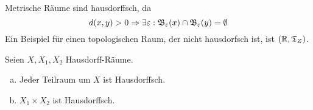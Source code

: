 \begin{bemerkung}
    Metrische Räume sind hausdorffsch, da 
    \[d(x,y) > 0 \Rightarrow \exists \varepsilon: \mathfrak{B}_\varepsilon(x) \cap \mathfrak{B}_\varepsilon(y) = \emptyset\]
    Ein Beispiel für einen topologischen Raum, der nicht hausdorfsch ist,
    ist $(\mathbb{R}, \mathfrak{T}_Z)$.
\end{bemerkung}

\begin{bemerkung}
    Seien $X, X_1, X_2$ Hausdorff-Räume.
    \begin{enumerate}[a)]
        \item Jeder Teilraum um $X$ ist Hausdorffsch.
        \item $X_1 \times X_2$ ist Hausdorffsch.
    \end{enumerate}
\end{bemerkung}

